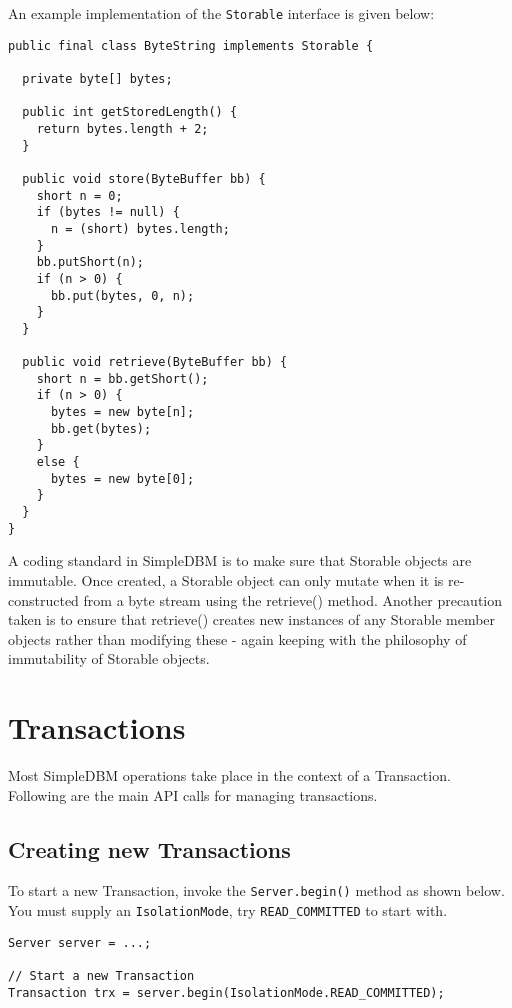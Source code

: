 \documentclass[a4paper,draft,oneside]{book}
\begin{document}
An example implementation of the \verb|Storable| interface is 
given below:

\begin{verbatim}
public final class ByteString implements Storable {
    
  private byte[] bytes;
    
  public int getStoredLength() {
    return bytes.length + 2;
  }
    
  public void store(ByteBuffer bb) {
    short n = 0;
    if (bytes != null) {
      n = (short) bytes.length;
    }
    bb.putShort(n);
    if (n > 0) {
      bb.put(bytes, 0, n);
    }
  }
    
  public void retrieve(ByteBuffer bb) {
    short n = bb.getShort();
    if (n > 0) {
      bytes = new byte[n];
      bb.get(bytes);
    }
    else {
      bytes = new byte[0];
    }
  }
}
\end{verbatim}

A coding standard in SimpleDBM is to make sure that Storable objects
are immutable. Once created, a Storable object can only mutate when it
is re-constructed from a byte stream using the retrieve()
method. Another precaution taken is to ensure that retrieve() creates
new instances of any Storable member objects rather than modifying
these - again keeping with the philosophy of immutability of Storable
objects.

\chapter{Transactions}

Most SimpleDBM operations take place in the context of a Transaction.
Following are the main API calls for managing transactions.

\section{Creating new Transactions}

To start a new Transaction, invoke the \verb|Server.begin()| method as
shown below. You must supply an \verb|IsolationMode|, try
\verb|READ_COMMITTED| to start with.

\begin{verbatim}
Server server = ...;

// Start a new Transaction
Transaction trx = server.begin(IsolationMode.READ_COMMITTED);

\end{verbatim}
\end{document}
